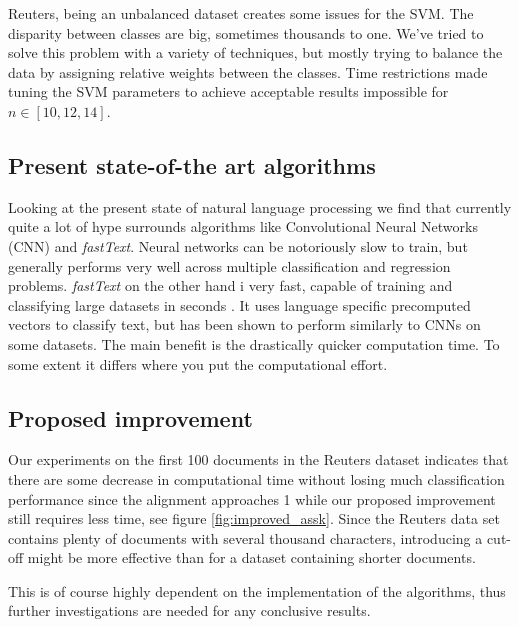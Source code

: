 Reuters, being an unbalanced dataset creates some issues for the SVM. The disparity between classes are big, sometimes thousands to one. We've tried to solve this problem with a variety of techniques, but mostly trying to balance the data by assigning relative weights between the classes. Time restrictions made tuning the SVM parameters to achieve acceptable results impossible for $ n \in [10,12,14] $. 



\subsection{Present state-of-the art algorithms}
Looking at the present state of natural language processing we find that currently quite a lot of hype surrounds algorithms like Convolutional Neural Networks (CNN) and \textit{fastText}. Neural networks can be notoriously slow to train, but generally performs very well across multiple classification and regression problems. \textit{fastText} on the other hand i very fast, capable of training and classifying large datasets in seconds \cite{joulin2016bag}. It uses language specific precomputed vectors to classify text, but has been shown to perform similarly to CNNs on some datasets. The main benefit is the drastically quicker computation time. To some extent it differs where you put the computational effort.

\subsection{Proposed improvement}
Our experiments on the first 100 documents in the Reuters dataset indicates that there are some decrease in computational time without losing much classification performance since the alignment approaches 1 while our proposed improvement still requires less time, see figure \ref{fig:improved_assk}. Since the Reuters data set contains plenty of documents with several thousand characters, introducing a cut-off might be more effective than for a dataset containing shorter documents. 

 This is of course highly dependent on the implementation of the algorithms, thus further investigations are needed for any conclusive results. 
